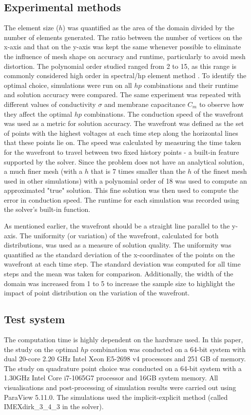 \subsection{Experimental methods}
The element size ($h$) was quantified as the area of the domain divided by the number of elements generated. The ratio between the number of vertices on the x-axis and that on the y-axis was kept the same whenever possible to eliminate the influence of mesh shape on accuracy and runtime, particularly to avoid mesh distortion. The polynomial order studied ranged from 2 to 15, as this range is commonly considered high order in spectral/hp element method \cite{RefWorks:cantwell2011efficiently:}. To identify the optimal choice, simulations were run on all $hp$ combinations and their runtime and solution accuracy were compared. The same experiment was repeated with different values of conductivity $\sigma$ and membrane capacitance $C_m$ to observe how they affect the optimal $hp$ combinations. The conduction speed of the wavefront was used as a metric for solution accuracy. The wavefront was defined as the set of points with the highest voltages at each time step along the horizontal lines that these points lie on. The speed was calculated by measuring the time taken for the wavefront to travel between two fixed history points - a built-in feature supported by the solver. Since the problem does not have an analytical solution, a much finer mesh (with a $h$ that is 7 times smaller than the $h$ of the finest mesh used in other simulations) with a polynomial order of 18 was used to compute an approximated "true" solution. This fine solution was then used to compute the error in conduction speed. The runtime for each simulation was recorded using the solver's built-in function. 
\par
As mentioned earlier, the wavefront should be a straight line parallel to the y-axis. The uniformity (or variation) of the wavefront, calculated for both distributions, was used as a measure of solution quality. The uniformity was quantified as the standard deviation of the x-coordinates of the points on the wavefront at each time step. The standard deviation was computed for all time steps and the mean was taken for comparison. Additionally, the width of the domain was increased from 1 to 5 to increase the sample size to highlight the impact of point distribution on the variation of the wavefront. 

\subsection{Test system}
The computation time is highly dependent on the hardware used. In this paper, the study on the optimal $hp$ combination was conducted on a 64-bit system with dual 20-core 2.20 GHz Intel Xeon E5-2698 v4 processors and 251 GB of memory. The study on quadrature point choice was conducted on a 64-bit system with a 1.30GHz Intel Core i7-1065G7 processor and 16GB system memory. All visualisations and post-processing of simulation results were carried out using ParaView 5.11.0. The simulations used the implicit-explicit method (called IMEXdirk\_3\_4\_3 in the solver).